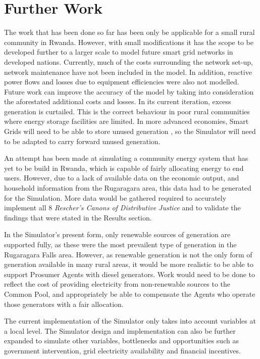 \chapter{Further Work}
\label{Further Work}

The work that has been done so far has been only be applicable for a small rural community in Rwanda. However, with small modifications it has the scope to be developed further to a larger scale to model future smart grid networks in developed nations. Currently, much of the costs surrounding the network set-up, network maintenance have not been included in the model. In addition, reactive power flows and losses due to equipment efficiencies were also not modelled. Future work can improve the accuracy of the model by taking into consideration the aforestated additional costs and losses. In its current iteration, excess generation is curtailed. This is the correct behaviour in poor rural communities where energy storage facilities are limited. In more advanced economies, Smart Grids will need to be able to store unused generation \cite{IEEE-SmartGrid:2015}, so the Simulator will need to be adapted to carry forward unused generation.

An attempt has been made at simulating a community energy system that has yet to be build in Rwanda, which is capable of fairly allocating energy to end users. However, due to a lack of available data on the economic output, and household information from the Rugaragara area, this data had to be generated for the Simulation. More data would be gathered required to accurately implement all 8 \textit{Rescher's Canons of Distributive Justice} and to validate the findings that were stated in the Results section.

In the Simulator's present form, only renewable sources of generation are supported fully, as these were the most prevailent type of generation in the Rugaragara Falls area. However, as renewable generation is not the only form of generation available in many rural areas, it would be more realistic to be able to support Prosumer Agents with diesel generators. Work would need to be done to reflect the cost of providing electricity from non-renewable sources to the Common Pool, and appropriately be able to compensate the Agents who operate those generators with a fair allocation.

The current implementation of the Simulator only takes into account variables at a local level. The Simulator design and implementation can also be further expanded to simulate other variables, bottlenecks and opportunities such as government intervention, grid electricity availability and financial incentives. 

